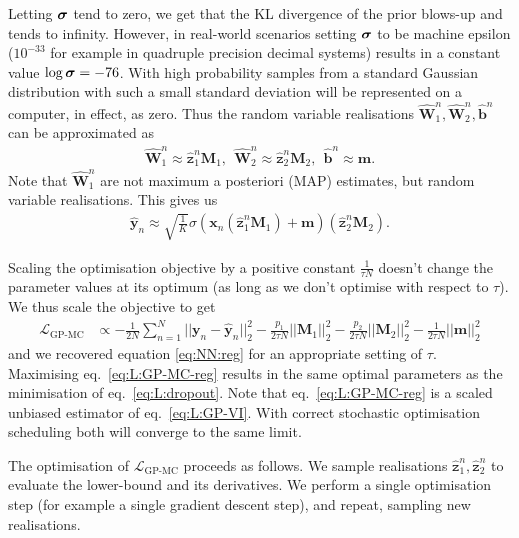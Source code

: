 \documentclass{article} %
\def\red#1{\textcolor{red}{#1}}
\newcommand{\cL}{\mathcal{L}}
\newcommand{\x}{\mathbf{x}}
\newcommand{\Bb}{\mathbf{b}}
\newcommand{\sBb}{\mathtt{z}}
\newcommand{\y}{\mathbf{y}}
\newcommand{\W}{\mathbf{W}}
\newcommand{\m}{\mathbf{m}}
\newcommand{\M}{\mathbf{M}}
\newcommand{\bsigma}{\text{\boldmath$\sigma$}}
\theoremstyle{definition}
\begin{document}
Letting $\bsigma$ tend to zero, we get that the KL divergence of the prior blows-up and tends to infinity. However, in real-world scenarios setting $\bsigma$ to be machine epsilon ($10^{-33}$ for example in quadruple precision decimal systems) results in a constant value $\log \bsigma = -76$. With high probability samples from a standard Gaussian distribution with such a small standard deviation will be represented on a computer, in effect, as zero. Thus the random variable realisations $\widehat{\W}_1^n, \widehat{\W}_2^n, \widehat{\Bb}^n$ can be approximated as
\begin{align*}
\widehat{\W}_1^n \approx \widehat{\sBb}_1^n \M_1, ~~
\widehat{\W}_2^n \approx \widehat{\sBb}_2^n \M_2, ~~
\widehat{\Bb}^n \approx \m.
\end{align*}
Note that $\widehat{\W}_1^n$ are not maximum a posteriori (MAP) estimates, but random variable realisations.
This gives us 
\begin{align*}
\widehat{\y}_n \approx \sqrt{\frac{1}{K}} \sigma(\x_n (\widehat{\sBb}_1^n \M_1) + \m) (\widehat{\sBb}_2^n \M_2).
\end{align*}

Scaling the optimisation objective by a positive constant $\frac{1}{\tau N}$ doesn't change the parameter values at its optimum (as long as we don't optimise with respect to $\tau$). 
We thus scale the objective to get
\begin{align} \label{eq:L:GP-MC-reg}
\cL_{\text{GP-MC}} &\propto  - \frac{1}{2 N} \sum_{n=1}^N || \y_n - \widehat{\y}_n ||^2_2 - \frac{p_1}{2 \tau N} ||\M_1||^2_2 - \frac{p_2}{2 \tau N} ||\M_2||^2_2 - \frac{1}{2 \tau N}||\m||^2_2 
\end{align}
and we recovered equation \eqref{eq:NN:reg} for an appropriate setting of $\tau$. Maximising eq.\ \eqref{eq:L:GP-MC-reg} results in the same optimal parameters as the minimisation of eq.\ \eqref{eq:L:dropout}. Note that eq.\ \eqref{eq:L:GP-MC-reg} is a scaled unbiased estimator of eq.\ \eqref{eq:L:GP-VI}. With correct stochastic optimisation scheduling both will converge to the same limit.


The optimisation of $\cL_{\text{GP-MC}}$ proceeds as follows. We sample realisations $\widehat{\sBb}_1^n, \widehat{\sBb}_2^n$ to evaluate the lower-bound and its derivatives. We perform a single optimisation step (for example a single gradient descent step), and repeat, sampling new realisations.
\end{document}

